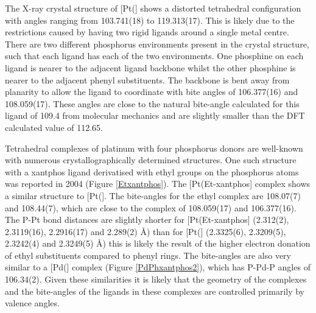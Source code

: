 The X-ray crystal structure of [Pt(\Phthixantphos{}] shows a distorted tetrahedral configuration with angles ranging from 103.741(18) to 119.313(17)\degrees.  This is likely due to the restrictions caused by having two rigid \Phxantphos{} ligands around a single metal centre.  There are two different phosphorus environments present in the crystal structure, such that each ligand has each of the two environments.  One phosphine on each ligand is nearer to the adjacent ligand backbone whilst the other phosphine is nearer to the adjacent phenyl substituents.  The backbone is bent away from planarity to allow the ligand to coordinate with bite angles of 106.377(16) and 108.059(17)\degrees. These angles are close to the natural bite-angle calculated for this ligand of 109.4\degrees{} from molecular mechanics and are slightly smaller than the DFT calculated value of 112.65\degrees.\cite{Birkholz2009}

Tetrahedral complexes of platinum with four phosphorus donors are well-known with numerous crystallographically determined structures.\cite{Allen2002}  One such structure with a xantphos ligand derivatised with ethyl groups on the phosphorus atoms was reported in 2004 (Figure \ref{Etxantphos}).\cite{Miedaner2004}  The [Pt(Et-xantphos] complex shows a similar structure to [Pt(\Phthixantphos{}].  The bite-angles for the ethyl complex are 108.07(7) and 108.44(7)\degrees, which are close to the \Phthixantphos{} complex of 108.059(17) and 106.377(16)\degrees.  The P-Pt bond distances are slightly shorter for [Pt(Et-xantphos] (2.312(2), 2.3119(16), 2.2916(17) and 2.289(2) \si{\angstrom}) than for [Pt(\Phthixantphos{}] (2.3325(6), 2.3209(5), 2.3242(4) and 2.3249(5) \si{\angstrom}) this is likely the result of the higher electron donation of ethyl substituents compared to phenyl rings.  The bite-angles are also very similar to a [Pd(\Phxantphos{}] complex (Figure \ref{PdPhxantphos2}), which has P-Pd-P angles of 106.34(2)\degrees{}.\cite{Grushin2006} Given these similarities it is likely that the geometry of the complexes and the bite-angles of the ligands in these complexes are controlled primarily by valence angles. 



